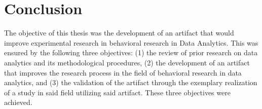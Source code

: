 

\section{Conclusion}

The objective of this thesis was the development of an artifact that would improve experimental research in behavioral research in Data Analytics. This was ensured by the following three objectives: (1) the review of prior research on data analytics and its methodological procedures, (2) the development of an artifact that improves the research process in the field of behavioral research in data analytics, and (3) the validation of the artifact through the exemplary realization of a study in said field utilizing said artifact. These three objectives were achieved.

